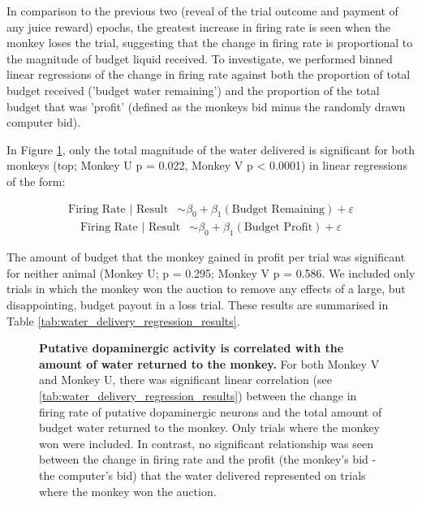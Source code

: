 In comparison to the previous two (reveal of the trial outcome and payment of any juice reward) epochs, the greatest increase in firing rate is seen when the monkey loses the trial, suggesting that the change in firing rate is proportional to the magnitude of budget liquid received. To investigate, we performed binned linear regressions of the change in firing rate against both the proportion of total budget received ('budget water remaining') and the proportion of the total budget that was 'profit' (defined as the monkeys bid minus the randomly drawn computer bid).

In Figure \ref{fig:water_delivery_regression_fig}, only the total magnitude of the water delivered is significant for both monkeys (top; Monkey U p = 0.022, Monkey V p < 0.0001) in linear regressions of the form:

\begin{align}
\text{Firing Rate | Result} &\sim \beta_0 + \beta_1(\text{Budget Remaining}) + \varepsilon \label{eq:firing_rate_budget_regression1}
\end{align}
\begin{align}
\text{Firing Rate | Result} &\sim \beta_0 + \beta_1(\text{Budget Profit}) + \varepsilon \label{eq:firing_rate_budget_regression2}
\end{align}


The amount of budget that the monkey gained in profit per trial was significant for neither animal (Monkey U; p = 0.295; Monkey V p = 0.586. We included only trials in which the monkey won the auction to remove any effects of a large, but disappointing, budget payout in a loss trial. These results are summarised in Table \ref{tab:water_delivery_regression_results}.

\begin{figure}[htbp!] 
\centering    

\caption[Putative dopaminergic activity is correlated with the amount of water returned to the monkey.]{\textbf{Putative dopaminergic activity is correlated with the amount of water returned to the monkey.} For both Monkey V and Monkey U, there was significant linear correlation (see \ref{tab:water_delivery_regression_results}) between the change in firing rate of putative dopaminergic neurons and the total amount of budget water returned to the monkey. Only trials where the monkey won were included. In contrast, no significant relationship was seen between the change in firing rate and the profit (the monkey's bid - the computer's bid) that the water delivered represented on trials where the monkey won the auction.}
\label{fig:water_delivery_regression_fig}
\end{figure}

